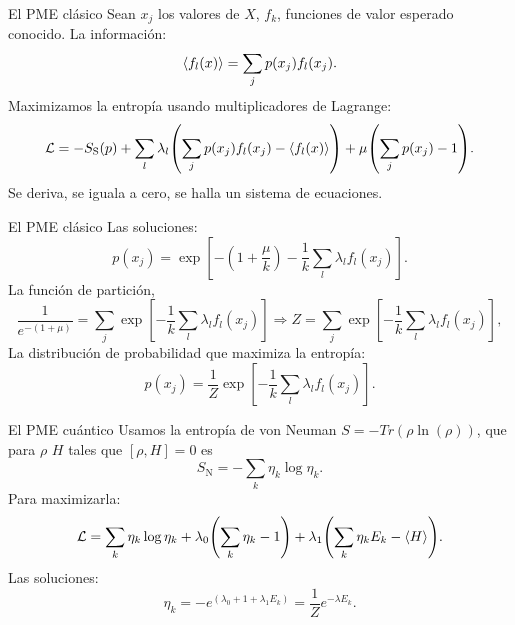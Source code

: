 \begin{frame}{El PME clásico}
    Sean $x_{j}$ los valores de $X$, $f_{k}$, funciones de valor esperado conocido. La información:
    \begin{equation}
    \expval{f_{l}(x)}=\sum_{j}p(x_{j})f_{l}(x_{j}).\nonumber
    \end{equation}
    Maximizamos la entropía usando multiplicadores de Lagrange:
    \begin{equation}
        \mathcal{L}=-S_{\text{S}}(p)+\sum_{l}\lambda_{l}\qty(\sum_{j}p(x_{j})f_{l}(x_{j})-\expval{f_{l}(x)})+\mu\qty(\sum_{j}p(x_{j})-1).\nonumber
    \end{equation}
    Se deriva, se iguala a cero, se halla un sistema de ecuaciones.
\end{frame}

\begin{frame}{El PME clásico}
    Las soluciones:
    \begin{equation}
        p(x_{j})=\exp[-(1+\frac{\mu}{k})-\frac{1}{k}\sum_{l}\lambda_{l}f_{l}(x_{j})].\nonumber
    \end{equation}
    La función de partición,
    \begin{equation}
        \frac{1}{e^{-(1+\mu)}}=\sum_{j}\exp[-\frac{1}{k}\sum_{l}\lambda_{l}f_{l}(x_{j})] \Rightarrow Z=\sum_{j}\exp[-\frac{1}{k}\sum_{l}\lambda_{l}f_{l}(x_{j})],\nonumber
    \end{equation}
    La distribución de probabilidad que maximiza la entropía: 
    \begin{equation}
        p(x_{j})=\frac{1}{Z}\exp[-\frac{1}{k}\sum_{l}\lambda_{l}f_{l}(x_{j})].\nonumber
    \end{equation}
\end{frame}

\begin{frame}{El PME cuántico}
    Usamos la entropía de von Neuman $S=-Tr(\rho\ln(\rho))$, que para $\rho$ $H$ tales que $[\rho,H]=0$ es
    \begin{equation}
        S_{\text{N}}=-\sum_{k}\eta_{k}\log{\eta_{k}}.\nonumber
    \end{equation}
    Para maximizarla:
    \begin{equation}
        \mathcal{L}=\sum_{k}\eta_{k}\log{\eta_{k}}+\lambda_{0}\qty(\sum_{k}\eta_{k}-1)+\lambda_{1}\qty(\sum_{k}\eta_{k}E_{k}-\expval{H}).\nonumber
    \end{equation}
    Las soluciones:
    \begin{equation}
        \eta_{k}=-e^{(\lambda_{0}+1+\lambda_{1}E_{k})}=\frac{1}{Z}e^{-\lambda E_{k}}.\nonumber
    \end{equation}
\end{frame}

